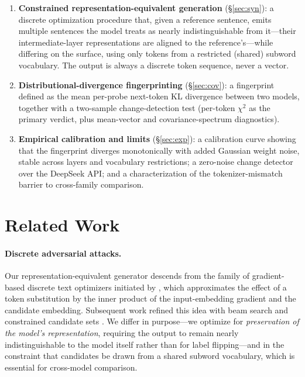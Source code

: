 \documentclass[11pt]{article}
\theoremstyle{definition}
\begin{document}
\begin{enumerate}
  \item \textbf{Constrained representation-equivalent generation}
  (\S\ref{sec:syn}): a discrete optimization procedure that, given a
  reference sentence, emits multiple sentences the model treats as nearly
  indistinguishable from it---their intermediate-layer representations are
  aligned to the reference's---while differing on the surface, using only tokens
  from a restricted (shared) subword vocabulary. The output is always a discrete
  token sequence, never a vector.

  \item \textbf{Distributional-divergence fingerprinting}
  (\S\ref{sec:cov}): a fingerprint defined as the mean per-probe next-token KL
  divergence between two models, together with a two-sample change-detection
  test (per-token $\chi^2$ as the primary verdict, plus mean-vector and
  covariance-spectrum diagnostics).

  \item \textbf{Empirical calibration and limits} (\S\ref{sec:exp}): a
  calibration curve showing that the fingerprint diverges monotonically with
  added Gaussian weight noise, stable across layers and vocabulary
  restrictions; a zero-noise change detector over the DeepSeek API; and a
  characterization of the tokenizer-mismatch barrier to cross-family
  comparison.
\end{enumerate}

\section{Related Work}
\label{sec:related}

\paragraph{Discrete adversarial attacks.}
Our representation-equivalent generator descends from the family of gradient-based
discrete text optimizers initiated by \citet{hotflip}, which approximates the
effect of a token substitution by the inner product of the input-embedding
gradient and the candidate embedding. Subsequent work refined this idea with
beam search and constrained candidate sets \citep{textfooler}. We differ in
purpose---we optimize for \emph{preservation of the model's representation},
requiring the output to remain nearly indistinguishable to the model itself
rather than for label flipping---and in the constraint that candidates be drawn
from a shared subword vocabulary, which is essential for cross-model
comparison.
\end{document}
